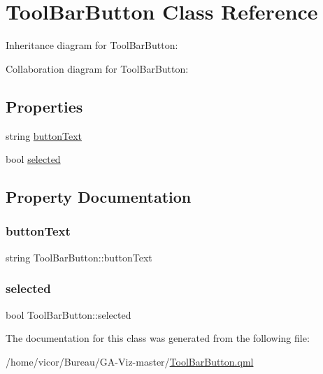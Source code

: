 \hypertarget{class_tool_bar_button}{}\section{Tool\+Bar\+Button Class Reference}
\label{class_tool_bar_button}


Inheritance diagram for Tool\+Bar\+Button\+:


Collaboration diagram for Tool\+Bar\+Button\+:
\subsection*{Properties}
\begin{DoxyCompactItemize}
\item 
string \hyperlink{class_tool_bar_button_a3d59d34964733c7748a9a7e40073e346}{button\+Text}
\item 
bool \hyperlink{class_tool_bar_button_a4031c8e03369a4ba37bda2951db0c582}{selected}
\end{DoxyCompactItemize}


\subsection{Property Documentation}
\mbox{\label{class_tool_bar_button_a3d59d34964733c7748a9a7e40073e346}} 
\subsubsection{\texorpdfstring{button\+Text}{buttonText}}
{\footnotesize\ttfamily string Tool\+Bar\+Button\+::button\+Text}

\mbox{\label{class_tool_bar_button_a4031c8e03369a4ba37bda2951db0c582}} 
\subsubsection{\texorpdfstring{selected}{selected}}
{\footnotesize\ttfamily bool Tool\+Bar\+Button\+::selected}



The documentation for this class was generated from the following file\+:\begin{DoxyCompactItemize}
\item 
/home/vicor/\+Bureau/\+G\+A-\/\+Viz-\/master/\hyperlink{_tool_bar_button_8qml}{Tool\+Bar\+Button.\+qml}\end{DoxyCompactItemize}

